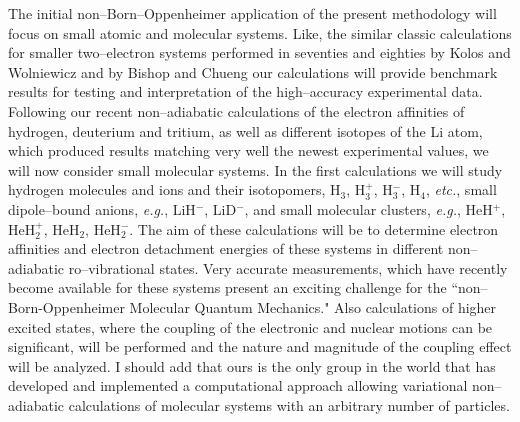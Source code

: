The initial non--Born--Oppenheimer
application of the present methodology
will focus on
small atomic and molecular systems.
Like, the similar classic calculations for 
smaller two--electron
systems performed in seventies and eighties by
Kolos and Wolniewicz and by Bishop and Chueng 
our calculations will provide benchmark results
for testing and interpretation of 
the high--accuracy experimental data.
Following our recent non--adiabatic calculations
of the electron affinities of hydrogen, deuterium and 
tritium,\cite{1}
as well as different isotopes of the Li atom,
which produced results matching very well the newest
experimental
values, we will now consider small molecular systems.
In the first calculations
we will study
hydrogen molecules and ions and their isotopomers,
H$_3$, H$_3^+$, H$_3^-$, H$_4$, {\it etc.},
small dipole--bound anions, {\it e.g.}, LiH$^-$, LiD$^-$,
and small molecular clusters, 
{\it e.g.}, HeH$^+$, HeH$_2^+$, HeH$_2$, HeH$_2^-$.
The aim of these calculations will be to determine
electron affinities and electron detachment energies
of these systems in different non--adiabatic 
ro--vibrational states.
Very accurate measurements, which have
recently become
available
for these systems
present an exciting challenge for
the ``non--Born-Oppenheimer Molecular Quantum Mechanics."
Also calculations of
higher excited states,
where the coupling of the electronic and nuclear motions
can be significant,
will be performed and the nature and magnitude of the
coupling effect will be
analyzed.
I should add that ours is the only group in the world that
has developed and implemented a computational approach allowing
variational non--adiabatic calculations of molecular
systems with an arbitrary number of particles.



